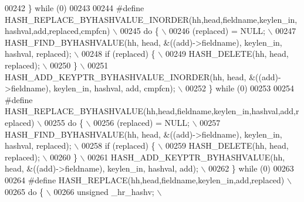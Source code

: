 \begin{DoxyCode}
{{{00242 \textcolor{preprocessor}{\} while (0)}
00243 
00244 \textcolor{preprocessor}{#define HASH\_REPLACE\_BYHASHVALUE\_INORDER(hh,head,fieldname,keylen\_in,hashval,add,replaced,cmpfcn) \(\backslash\)}
00245 \textcolor{preprocessor}{do \{                                                                             \(\backslash\)}
00246 \textcolor{preprocessor}{  (replaced) = NULL;                                                             \(\backslash\)}
00247 \textcolor{preprocessor}{  HASH\_FIND\_BYHASHVALUE(hh, head, &((add)->fieldname), keylen\_in, hashval, replaced); \(\backslash\)}
00248 \textcolor{preprocessor}{  if (replaced) \{                                                                \(\backslash\)}
00249 \textcolor{preprocessor}{    HASH\_DELETE(hh, head, replaced);                                             \(\backslash\)}
00250 \textcolor{preprocessor}{  \}                                                                              \(\backslash\)}
00251 \textcolor{preprocessor}{  HASH\_ADD\_KEYPTR\_BYHASHVALUE\_INORDER(hh, head, &((add)->fieldname), keylen\_in, hashval, add, cmpfcn); \(\backslash\)}
00252 \textcolor{preprocessor}{\} while (0)}
00253 
00254 \textcolor{preprocessor}{#define HASH\_REPLACE\_BYHASHVALUE(hh,head,fieldname,keylen\_in,hashval,add,replaced) \(\backslash\)}
00255 \textcolor{preprocessor}{do \{                                                                             \(\backslash\)}
00256 \textcolor{preprocessor}{  (replaced) = NULL;                                                             \(\backslash\)}
00257 \textcolor{preprocessor}{  HASH\_FIND\_BYHASHVALUE(hh, head, &((add)->fieldname), keylen\_in, hashval, replaced); \(\backslash\)}
00258 \textcolor{preprocessor}{  if (replaced) \{                                                                \(\backslash\)}
00259 \textcolor{preprocessor}{    HASH\_DELETE(hh, head, replaced);                                             \(\backslash\)}
00260 \textcolor{preprocessor}{  \}                                                                              \(\backslash\)}
00261 \textcolor{preprocessor}{  HASH\_ADD\_KEYPTR\_BYHASHVALUE(hh, head, &((add)->fieldname), keylen\_in, hashval, add); \(\backslash\)}
00262 \textcolor{preprocessor}{\} while (0)}
00263 
00264 \textcolor{preprocessor}{#define HASH\_REPLACE(hh,head,fieldname,keylen\_in,add,replaced)                   \(\backslash\)}
00265 \textcolor{preprocessor}{do \{                                                                             \(\backslash\)}
00266 \textcolor{preprocessor}{  unsigned \_hr\_hashv;                                                            \(\backslash\)}
}}}
\end{DoxyCode}
